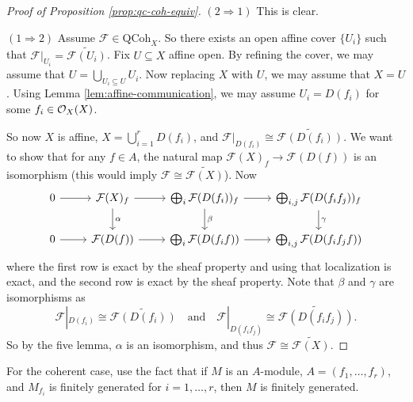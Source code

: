 \begin{proof}[Proof of Proposition \ref{prop:qc-coh-equiv}]
  $(2 \Rightarrow 1)$ This is clear.

  $(1 \Rightarrow 2)$ Assume
  $\mathcal{F} \in \mathrm{QCoh}_X$.
  So there exists an open affine
  cover $\{U_i\}$ such that
  $\mathcal{F}|_{U_i} = \widetilde{\mathcal{F}(U_i)}$.
  Fix $U \subseteq X$ affine open. By
  refining the cover, we may assume
  that $U = \bigcup_{U_i \subseteq U} U_i$.
  Now replacing $X$ with $U$, we may
  assume that $X = U$. Using
  Lemma \ref{lem:affine-communication},
  we may assume $U_i = D(f_i)$
  for some $f_i \in \mathcal{O}_X(X)$.

  So now
  $X$ is affine, $X = \bigcup_{i = 1}^r D(f_i)$,
  and $\mathcal{F}|_{D(f_i)} \cong \widetilde{\mathcal{F}(D(f_i))}$.
  We want to show that
  for any $f \in A$, the natural
  map $\mathcal{F}(X)_f \to \mathcal{F}(D(f))$
  is an isomorphism (this would imply
  $\mathcal{F} \cong \widetilde{\mathcal{F}(X)}$). Now
  \[
    \begin{tikzcd}
      0 \ar[r]
      & \mathcal{F}(X)_f \ar[r] \ar[d, "\alpha"]
      & \bigoplus_i \mathcal{F}(D(f_i))_f \ar[r] \ar[d, "\beta"]
      & \bigoplus_{i, j} \mathcal{F}(D(f_i f_j))_f \ar[d, "\gamma"] \\
      0 \ar[r]
      & \mathcal{F}(D(f)) \ar[r]
      & \bigoplus_i \mathcal{F}(D(f_i f))
      \ar[r]
      & \bigoplus_{i, j} \mathcal{F}(D(f_i f_j f))
    \end{tikzcd}
  \]
  where the first row is exact by
  the sheaf property and using that
  localization is exact, and the
  second row is exact by the sheaf
  property. Note that
  $\beta$ and $\gamma$
  are isomorphisms as
  \[
    \mathcal{F}|_{D(f_i)}
    \cong \widetilde{\mathcal{F}(D(f_i))}
    \quad \text{and} \quad
    \mathcal{F}|_{D(f_i f_j)}
    \cong \widetilde{\mathcal{F}(D(f_i f_j))}.
  \]
  So by the five lemma,
  $\alpha$ is an isomorphism, and
  thus $\mathcal{F} \cong \widetilde{\mathcal{F}(X)}$.
\end{proof}

\begin{remark}
  For the coherent case, use the
  fact that if $M$ is an $A$-module,
  $A = (f_1, \dots, f_r)$,
  and $M_{f_i}$ is finitely
  generated for $i = 1, \dots, r$, then
  $M$ is finitely generated.
\end{remark}

